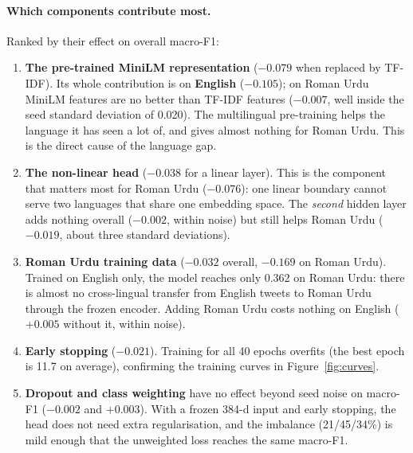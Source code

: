 \documentclass[11pt,a4paper]{article}
\begin{document}
\paragraph{Which components contribute most.} Ranked by their effect on overall macro-F1:
\begin{enumerate}
  \item \textbf{The pre-trained MiniLM representation} ($-0.079$ when replaced by TF-IDF). Its
        whole contribution is on \textbf{English} ($-0.105$); on Roman Urdu MiniLM features are
        no better than TF-IDF features ($-0.007$, well inside the seed standard deviation of
        0.020). The multilingual pre-training helps the language it has seen a lot of, and
        gives almost nothing for Roman Urdu. This is the direct cause of the language gap.
  \item \textbf{The non-linear head} ($-0.038$ for a linear layer). This is the component that
        matters most for Roman Urdu ($-0.076$): one linear boundary cannot serve two languages
        that share one embedding space. The \emph{second} hidden layer adds nothing overall
        ($-0.002$, within noise) but still helps Roman Urdu ($-0.019$, about three standard
        deviations).
  \item \textbf{Roman Urdu training data} ($-0.032$ overall, $-0.169$ on Roman Urdu). Trained on
        English only, the model reaches only 0.362 on Roman Urdu: there is almost no
        cross-lingual transfer from English tweets to Roman Urdu through the frozen encoder.
        Adding Roman Urdu costs nothing on English ($+0.005$ without it, within noise).
  \item \textbf{Early stopping} ($-0.021$). Training for all 40 epochs overfits (the best epoch
        is 11.7 on average), confirming the training curves in Figure~\ref{fig:curves}.
  \item \textbf{Dropout and class weighting} have no effect beyond seed noise on macro-F1
        ($-0.002$ and $+0.003$). With a frozen 384-d input and early stopping, the head does
        not need extra regularisation, and the imbalance (21/45/34\%) is mild enough that the
        unweighted loss reaches the same macro-F1.
\end{enumerate}
\end{document}
